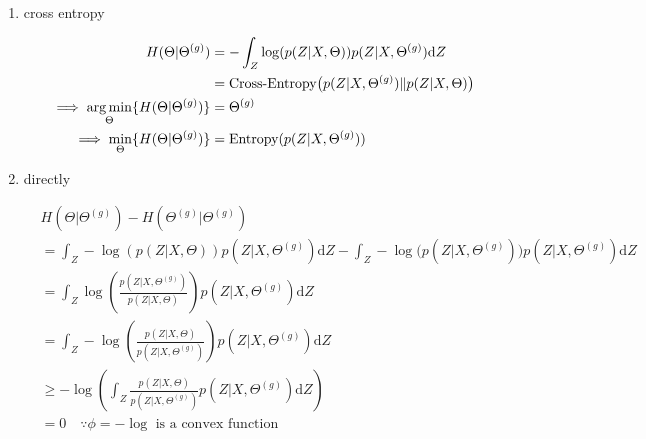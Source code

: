 \documentclass{article}
\def\L{{\cal L}}
\def\E{\mathbb{E}}
\def\d{\text{d}}
\def\E{{\mathbb{E}}}
\begin{document}
\begin{enumerate}
\item cross entropy

\begin{equation}\begin{split}
H(\Theta | \Theta^{(g)}) &= -  \int_{Z } \log (p(Z|X,\Theta)) p(Z|X,\Theta^{(g)}) \d Z\\
&= \text{Cross-Entropy} \big(p(Z|X,\Theta^{(g)}) \|  p(Z|X,\Theta) \big)\\
\implies \argmin_{\Theta} \{ H(\Theta | \Theta^{(g)}) \} &= \Theta^{(g)}\\
\implies \min_{\Theta} \{ H(\Theta | \Theta^{(g)}) \} &= \text{Entropy}( p(Z|X,\Theta^{(g)}))\\
\end{split}\end{equation}

\item directly

\begin{equation}\begin{split} 
&H( \Theta | \Theta^{(g)}) - H(\Theta^{(g)} | \Theta^{(g)})\\
&= \int_{Z } - \log (p(Z|X,\Theta)) p(Z|X,\Theta^{(g)}) \d Z - \int_{Z }  -\log \big( p(Z|X,\Theta^{(g)}) \big) p(Z|X,\Theta^{(g)}) \d Z \\
&= \int_{Z }  \log \left( \frac{p(Z|X,\Theta^{(g)})}{p(Z|X,\Theta)} \right) p(Z|X,\Theta^{(g)}) \d Z\\
&= \int_{Z }  - \log \left( \frac{p(Z|X,\Theta)}{p(Z|X,\Theta^{(g)})} \right) p(Z|X,\Theta^{(g)}) \d Z\\
&\ge   - \log \left( \int_{Z} \frac{p(Z|X,\Theta)}{p(Z|X,\Theta^{(g)})} p(Z|X,\Theta^{(g)}) \d Z \right)\\ 
&= 0\quad \because \phi = - \log \text{ is a convex function}
\end{split}\end{equation}


\end{enumerate}


\end{document}
